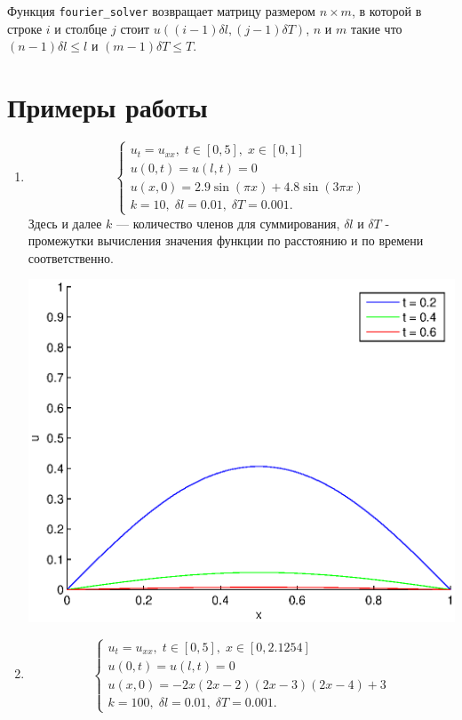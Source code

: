 \documentclass[11pt]{article}
\begin{document}
Функция \texttt{fourier\_solver} возвращает матрицу размером $n \times m$, в которой в строке $i$ и столбце $j$ стоит $u((i - 1) \delta l, (j - 1) \delta T)$, $n$ и $m$ такие что $(n - 1) \delta l \leqslant l$ и $(m - 1) \delta T \leqslant T$.

\section{Примеры работы}
\begin{enumerate}
\item
$$
\left\{
\begin{aligned}
u_t = u_{xx}, \; t \in [0, 5], \; x \in [0, 1] \\
u(0, t) = u(l, t) = 0 \\
u(x, 0) = 2.9 \sin(\pi x) + 4.8 \sin(3 \pi x) \\
k = 10, \; \delta l = 0.01, \; \delta T = 0.001.
\end{aligned}
\right.
$$
Здесь и далее $k$ --- количество членов для суммирования, $\delta l$ и $\delta T$ - промежутки вычисления значения функции по расстоянию и по времени соответственно.

\includegraphics[scale=0.8]{image1.eps} \newline
\item
$$
\left\{
\begin{aligned}
u_t = u_{xx}, \; t \in [0, 5], \; x \in [0, 2.1254] \\
u(0, t) = u(l, t) = 0 \\
u(x, 0) = -2x (2x - 2) (2x - 3) (2x - 4) + 3 \\
k = 100, \; \delta l = 0.01, \; \delta T = 0.001.
\end{aligned}
\right.
$$


\end{enumerate}
\end{document}
